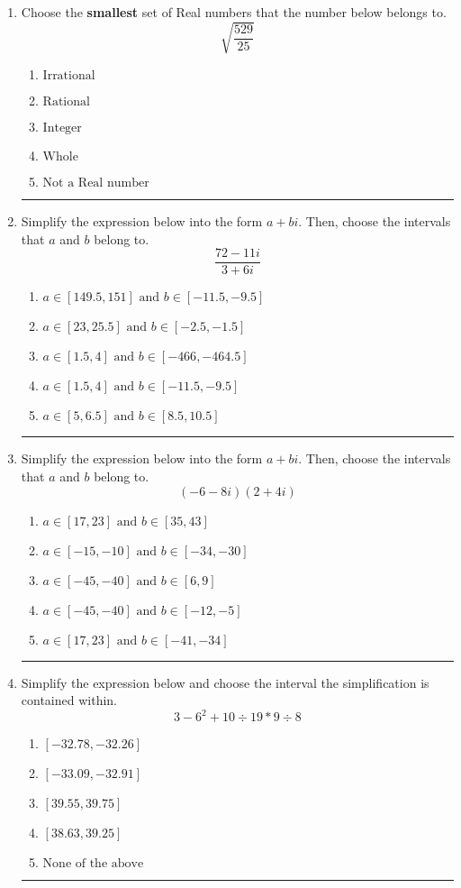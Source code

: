 \documentclass[14pt]{extbook}
\newcommand{\litem}[1]{\item#1\hspace*{-1cm}\rule{\textwidth}{0.4pt}}
\begin{document}
\begin{enumerate}
{\begin{enumerate}[label=\Alph*.]
\end{enumerate} }
\litem{
Choose the \textbf{smallest} set of Real numbers that the number below belongs to.\[ \sqrt{\frac{529}{25}} \]\begin{enumerate}[label=\Alph*.]
\item \( \text{Irrational} \)
\item \( \text{Rational} \)
\item \( \text{Integer} \)
\item \( \text{Whole} \)
\item \( \text{Not a Real number} \)

\end{enumerate} }

\litem{
Simplify the expression below into the form $a+bi$. Then, choose the intervals that $a$ and $b$ belong to.\[ \frac{72 - 11 i}{3 + 6 i} \]\begin{enumerate}[label=\Alph*.]
\item \( a \in [149.5, 151] \text{ and } b \in [-11.5, -9.5] \)
\item \( a \in [23, 25.5] \text{ and } b \in [-2.5, -1.5] \)
\item \( a \in [1.5, 4] \text{ and } b \in [-466, -464.5] \)
\item \( a \in [1.5, 4] \text{ and } b \in [-11.5, -9.5] \)
\item \( a \in [5, 6.5] \text{ and } b \in [8.5, 10.5] \)

\end{enumerate} }
\litem{
Simplify the expression below into the form $a+bi$. Then, choose the intervals that $a$ and $b$ belong to.\[ (-6 - 8 i)(2 + 4 i) \]\begin{enumerate}[label=\Alph*.]
\item \( a \in [17, 23] \text{ and } b \in [35, 43] \)
\item \( a \in [-15, -10] \text{ and } b \in [-34, -30] \)
\item \( a \in [-45, -40] \text{ and } b \in [6, 9] \)
\item \( a \in [-45, -40] \text{ and } b \in [-12, -5] \)
\item \( a \in [17, 23] \text{ and } b \in [-41, -34] \)

\end{enumerate} }

\litem{
Simplify the expression below and choose the interval the simplification is contained within.\[ 3 - 6^2 + 10 \div 19 * 9 \div 8 \]\begin{enumerate}[label=\Alph*.]
\item \( [-32.78, -32.26] \)
\item \( [-33.09, -32.91] \)
\item \( [39.55, 39.75] \)
\item \( [38.63, 39.25] \)
\item \( \text{None of the above} \)


\end{enumerate}}
\end{enumerate}
\end{document}
